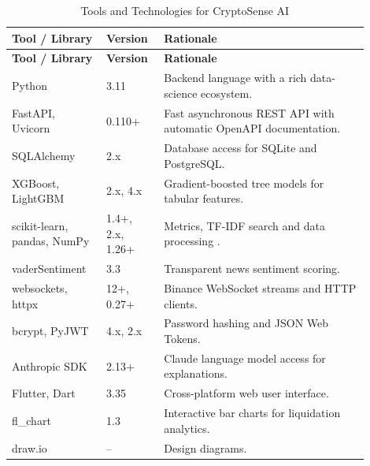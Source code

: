 {\renewcommand{\arraystretch}{1.3}
\begin{longtable}{|p{0.24\linewidth}|p{0.14\linewidth}|p{0.52\linewidth}|}
\caption{Tools and Technologies for CryptoSense AI}\label{tab:tools}\\\hline
\textbf{Tool / Library} & \textbf{Version} & \textbf{Rationale}\\\hline\endfirsthead
\hline\textbf{Tool / Library} & \textbf{Version} & \textbf{Rationale}\\\hline\endhead
Python & 3.11 & Backend language with a rich data-science ecosystem.\\\hline
FastAPI, Uvicorn & 0.110+ & Fast asynchronous REST API with automatic OpenAPI documentation.\\\hline
SQLAlchemy & 2.x & Database access for SQLite and PostgreSQL.\\\hline
XGBoost, LightGBM & 2.x, 4.x & Gradient-boosted tree models for tabular features.\\\hline
scikit-learn, pandas, NumPy & 1.4+, 2.x, 1.26+ & Metrics, TF-IDF search and data processing \cite{pedregosa2011sklearn}.\\\hline
vaderSentiment & 3.3 & Transparent news sentiment scoring.\\\hline
websockets, httpx & 12+, 0.27+ & Binance WebSocket streams and HTTP clients.\\\hline
bcrypt, PyJWT & 4.x, 2.x & Password hashing and JSON Web Tokens.\\\hline
Anthropic SDK & 2.13+ & Claude language model access for explanations.\\\hline
Flutter, Dart & 3.35 & Cross-platform web user interface.\\\hline
fl\_chart & 1.3 & Interactive bar charts for liquidation analytics.\\\hline
draw.io & -- & Design diagrams.\\\hline
\end{longtable}}

